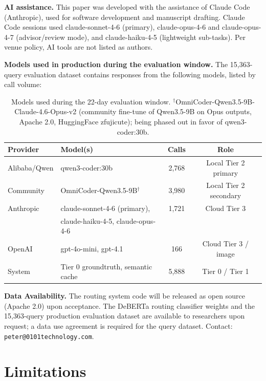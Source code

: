 \documentclass[11pt]{article}
\begin{document}
\textbf{AI assistance.} This paper was developed with the assistance of
Claude Code (Anthropic), used for software development and manuscript
drafting. Claude Code sessions used claude-sonnet-4-6 (primary),
claude-opus-4-6 and claude-opus-4-7 (advisor/review mode), and
claude-haiku-4-5 (lightweight sub-tasks). Per venue policy, AI tools are
not listed as authors.

\textbf{Models used in production during the evaluation window.} The
15,363-query evaluation dataset contains responses from the following
models, listed by call volume:

\begin{table}[h]
\centering
\small
\begin{tabular}{llcc}
\toprule
\textbf{Provider} & \textbf{Model(s)} & \textbf{Calls} & \textbf{Role} \\
\midrule
Alibaba/Qwen & qwen3-coder:30b & 2,768 & Local Tier 2 primary \\
Community & OmniCoder-Qwen3.5-9B$^\dagger$ & 3,980 & Local Tier 2 secondary \\
Anthropic & claude-sonnet-4-6 (primary), & 1,721 & Cloud Tier 3 \\
          & claude-haiku-4-5, claude-opus-4-6 & & \\
OpenAI & gpt-4o-mini, gpt-4.1 & 166 & Cloud Tier 3 / image \\
System & Tier 0 groundtruth, semantic cache & 5,888 & Tier 0 / Tier 1 \\
\bottomrule
\end{tabular}
\caption{Models used during the 22-day evaluation window.
$^\dagger$OmniCoder-Qwen3.5-9B-Claude-4.6-Opus-v2 (community fine-tune
of Qwen3.5-9B on Opus outputs, Apache 2.0, HuggingFace zfujicute);
being phased out in favor of qwen3-coder:30b.}
\label{tab:models}
\end{table}

\textbf{Data Availability.} The routing system code will be released as
open source (Apache 2.0) upon acceptance. The DeBERTa routing classifier
weights and the 15,363-query production evaluation dataset are available
to researchers upon request; a data use agreement is required for the
query dataset. Contact: \texttt{peter@0101technology.com}.




\section*{Limitations}
\label{sec:limitations}
\end{document}
